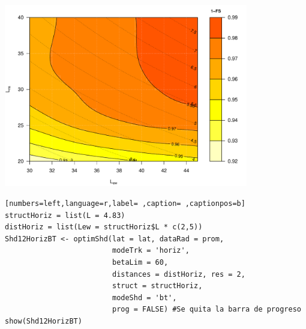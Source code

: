 \begin{center}
\includegraphics[width=0.8\textwidth]{figuras/codigo-optimshd2x.pdf}
\end{center}
\begin{lstlisting}[numbers=left,language=r,label= ,caption= ,captionpos=b]
structHoriz = list(L = 4.83)
distHoriz = list(Lew = structHoriz$L * c(2,5))
Shd12HorizBT <- optimShd(lat = lat, dataRad = prom,
                         modeTrk = 'horiz',
                         betaLim = 60,
                         distances = distHoriz, res = 2,
                         struct = structHoriz,
                         modeShd = 'bt',
                         prog = FALSE) #Se quita la barra de progreso
show(Shd12HorizBT)
\end{lstlisting}

